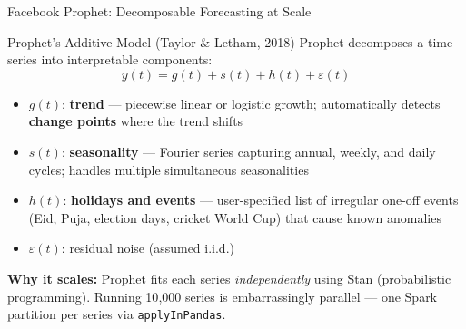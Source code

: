 \documentclass[aspectratio=169,10pt]{beamer}
\begin{document}
\begin{frame}{Facebook Prophet: Decomposable Forecasting at Scale}
 
      \begin{block}{Prophet's Additive Model (Taylor \& Letham, 2018)}
        Prophet decomposes a time series into interpretable components:
        \[y(t) = g(t) + s(t) + h(t) + \varepsilon(t)\]
        \begin{itemize}
          \item $g(t)$: \textbf{trend} --- piecewise linear or logistic growth; automatically detects \textbf{change points} where the trend shifts
          \item $s(t)$: \textbf{seasonality} --- Fourier series capturing annual, weekly, and daily cycles; handles multiple simultaneous seasonalities
          \item $h(t)$: \textbf{holidays and events} --- user-specified list of irregular one-off events (Eid, Puja, election days, cricket World Cup) that cause known anomalies
          \item $\varepsilon(t)$: residual noise (assumed i.i.d.)
        \end{itemize}
        \vspace{4pt}
        \textbf{Why it scales:}  Prophet fits each series \textit{independently} using Stan (probabilistic programming).  Running 10{,}000 series is embarrassingly parallel --- one Spark partition per series via \texttt{applyInPandas}.
      \end{block}
 
\end{frame}
\end{document}
